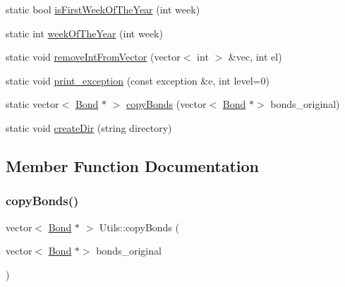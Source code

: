 \begin{DoxyCompactItemize}
\item 
static bool \mbox{\hyperlink{classUtils_aea07106862ac4b17a93bb598952b5f3c}{is\+First\+Week\+Of\+The\+Year}} (int week)
\item 
static int \mbox{\hyperlink{classUtils_a8318227e82678b727c4de0dda180e64a}{week\+Of\+The\+Year}} (int week)
\item 
static void \mbox{\hyperlink{classUtils_a01a90cec5c722c66a0d75d051f48dd03}{remove\+Int\+From\+Vector}} (vector$<$ int $>$ \&vec, int el)
\item 
static void \mbox{\hyperlink{classUtils_a0ce3051b18a14aad2608d31e25b5fdca}{print\+\_\+exception}} (const exception \&e, int level=0)
\item 
static vector$<$ \mbox{\hyperlink{classBond}{Bond}} $\ast$ $>$ \mbox{\hyperlink{classUtils_addb3e866200f4152d3f004b2c19c4aa9}{copy\+Bonds}} (vector$<$ \mbox{\hyperlink{classBond}{Bond}} $\ast$$>$ bonds\+\_\+original)
\item 
static void \mbox{\hyperlink{classUtils_ad22978d5ae586f881920c2c2452436ce}{create\+Dir}} (string directory)
\end{DoxyCompactItemize}


\subsection{Member Function Documentation}
\mbox{\label{classUtils_addb3e866200f4152d3f004b2c19c4aa9}} 
\subsubsection{\texorpdfstring{copy\+Bonds()}{copyBonds()}}
{\footnotesize\ttfamily vector$<$ \mbox{\hyperlink{classBond}{Bond}} $\ast$ $>$ Utils\+::copy\+Bonds (\begin{DoxyParamCaption}\item[{vector$<$ \mbox{\hyperlink{classBond}{Bond}} $\ast$$>$}]{bonds\+\_\+original }\end{DoxyParamCaption})\hspace{0.3cm}{\ttfamily [static]}}

\mbox{\label{classUtils_ac387c706746bffa0308e1fad7a6cd7a6}} 
